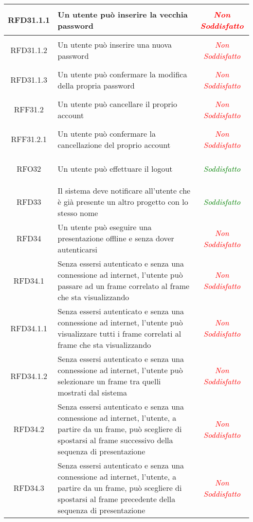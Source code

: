 \begin{longtable}{|c|>{\centering}m{7cm}|c|}
\hypertarget{RFD31.1.1}{RFD31.1.1} & Un utente può inserire la vecchia password & \textcolor{Red}{\textit{Non Soddisfatto}}\\ \hline
\hypertarget{RFD31.1.2}{RFD31.1.2} & Un utente può inserire una nuova password & \textcolor{Red}{\textit{Non Soddisfatto}}\\ \hline
\hypertarget{RFD31.1.3}{RFD31.1.3} & Un utente può confermare la modifica della propria password & \textcolor{Red}{\textit{Non Soddisfatto}}\\ \hline
\hypertarget{RFF31.2}{RFF31.2} & Un utente può cancellare il proprio account & \textcolor{Red}{\textit{Non Soddisfatto}}\\ \hline
\hypertarget{RFF31.2.1}{RFF31.2.1} & Un utente può confermare la cancellazione del proprio account & \textcolor{Red}{\textit{Non Soddisfatto}}\\ \hline
\hypertarget{RFO32}{RFO32} & Un utente può effettuare il logout & \textcolor{Green}{\textit{Soddisfatto}}\\ \hline
\hypertarget{RFD33}{RFD33} & Il sistema deve notificare all’utente che è già presente un altro progetto con lo stesso nome & \textcolor{Green}{\textit{Soddisfatto}}\\ \hline
\hypertarget{RFD34}{RFD34} & Un utente può eseguire una presentazione offline e senza dover autenticarsi & \textcolor{Red}{\textit{Non Soddisfatto}}\\ \hline
\hypertarget{RFD34.1}{RFD34.1} & Senza essersi autenticato e senza una connessione ad internet, l’utente può passare ad un frame correlato al frame che sta visualizzando & \textcolor{Red}{\textit{Non Soddisfatto}}\\ \hline
\hypertarget{RFD34.1.1}{RFD34.1.1} & Senza essersi autenticato e senza una connessione ad internet, l’utente può visualizzare tutti i frame correlati al frame che sta visualizzando & \textcolor{Red}{\textit{Non Soddisfatto}}\\ \hline
\hypertarget{RFD34.1.2}{RFD34.1.2} & Senza essersi autenticato e senza una connessione ad internet, l’utente può selezionare un frame tra quelli mostrati dal sistema & \textcolor{Red}{\textit{Non Soddisfatto}}\\ \hline
\hypertarget{RFD34.2}{RFD34.2} & Senza essersi autenticato e senza una connessione ad internet, l’utente, a partire da un frame, può scegliere di spostarsi al frame successivo della sequenza di presentazione & \textcolor{Red}{\textit{Non Soddisfatto}}\\ \hline
\hypertarget{RFD34.3}{RFD34.3} & Senza essersi autenticato e senza una connessione ad internet, l’utente, a partire da un frame, può scegliere di spostarsi al frame precedente della sequenza di presentazione & \textcolor{Red}{\textit{Non Soddisfatto}}\\ \hline

\end{longtable}
